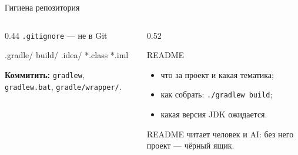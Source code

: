\begin{frame}[fragile]{Гигиена репозитория}
  \vspace{0.1em}
  \begin{columns}[T]
    \begin{column}{0.44\textwidth}
      {\footnotesize\texttt{.gitignore} --- не в Git}
      \begin{semiverbatim}
.gradle/
build/
.idea/
*.class
*.iml
      \end{semiverbatim}
      \vspace{0.5em}
      {\footnotesize\color{acGray}
      \textbf{Коммитить:} \texttt{gradlew}, \texttt{gradlew.bat},
      \texttt{gradle/wrapper/}.}
    \end{column}
    \begin{column}{0.52\textwidth}
      \begin{block}{README}
        \begin{itemize}
          \item что за проект и какая тематика;
          \item как собрать: \texttt{./gradlew build};
          \item какая версия JDK ожидается.
        \end{itemize}
      \end{block}
      \vspace{0.3em}
      {\footnotesize
      README читает человек и AI: без него проект --- чёрный ящик.}
    \end{column}
  \end{columns}
\end{frame}
